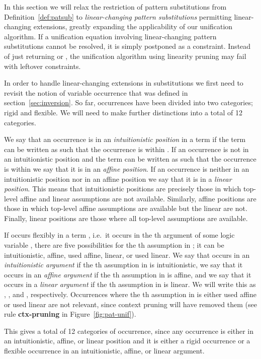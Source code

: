 \documentclass{eptcs}
\theoremstyle{definition}
\begin{document}
In this section we will relax the restriction of pattern substitutions
from Definition~\ref{def:patsub} to \emph{linear-changing pattern substitutions}
permitting linear-changing extensions, greatly
expanding the applicability of our unification algorithm. If a
unification equation involving linear-changing pattern
substitutions cannot be resolved, it is simply postponed as a
constraint.  Instead of just returning  or ,
the unification algorithm using linearity pruning may fail with 
leftover constraints.



In order to handle linear-changing extensions in substitutions we
first need to revisit the notion of variable occurrence that was defined in
section~\ref{sec:inversion}.  So far, occurrences have been
divided into two categories; rigid and flexible.  We will need to make
further distinctions into a total of 12 categories.

We say that an occurrence is in an \emph{intuitionistic position}
in a term if the term can be written as  such
that the occurrence is within .  If an occurrence is not in an
intuitionistic position and the term can be written as
 such that the occurrence is within
 we say that it is in an \emph{affine position}.
If an occurrence is neither in an intuitionistic position nor in an
affine position we say that it is in a \emph{linear position}.
This means that intuitionistic positions are precisely those
in which top-level affine and linear assumptions are
not available. Similarly,  affine positions are those in which top-level affine
assumptions are available but the linear are not.  Finally,  linear
positions are those where all top-level assumptions are available.

If   occurs flexibly in a term , i.e.\ it occurs in the th
argument of some logic variable , there are five possibilities for
the th assumption in ; it can be intuitionistic, affine,
used affine, linear, or used linear.  We say that  occurs in an
\emph{intuitionistic argument} if the th assumption in  is
intuitionistic, we say that it occurs in an \emph{affine argument} if
the th assumption in  is affine, and we say that it occurs
in a \emph{linear argument} if the th assumption in  is
linear.  We will write this as ,
, and , respectively.
Occurrences where the th assumption in  is either
used affine or used linear are not relevant, since context pruning
will have removed them
(see rule \textbf{ctx-pruning} in Figure~\ref{fig:pat-unif}).

This gives a total of 12 categories of occurrence, since any occurrence
is either in an intuitionistic, affine, or linear position and it is
either a rigid occurrence or a flexible occurrence in an intuitionistic,
affine, or linear argument.
\end{document}

